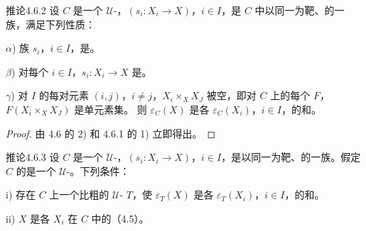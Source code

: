 \begin{SGAresult}{推论}{4.6.2}
设 $C$ 是一个 $\mathcal U$-，$(s_i:X_i\to X)$，$i\in I$，是 $C$ 中以同一为靶、的一族，满足下列性质：
\par $\alpha$) 族 $s_i$，$i\in I$，是。
\par $\beta$) 对每个 $i\in I$，$s_i:X_i\to X$ 是。
\par $\gamma$) 对 $I$ 的每对元素 $(i,j)$，$i\ne j$，$X_i\times_XX_J$ 被空，即对 $C$ 上的每个 $F$，$F(X_i\times_XX_J)$ 是单元素集。
则 $\varepsilon_C(X)$ 是各 $\varepsilon_C(X_i)$，$i\in I$，的和。
\end{SGAresult}
\begin{proof}由 4.6 的 2) 和 4.6.1 的 1) 立即得出。\end{proof}
\begin{SGAresult}{推论}{4.6.3}
设 $C$ 是一个 $\mathcal U$-，$(s_i:X_i\to X)$，$i\in I$，是以同一为靶、的一族。假定 $C$ 的是一个 $\mathcal U$-。下列条件：
\par i) 存在 $C$ 上一个比粗的 $\mathcal U$- $T$，使 $\varepsilon_T(X)$ 是各 $\varepsilon_T(X_i)$，$i\in I$，的和。
\par ii)  $X$ 是各 $X_i$ 在 $C$ 中的（4.5）。
\end{SGAresult}
